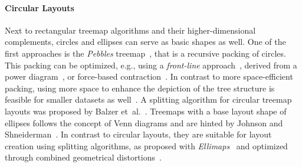 \documentclass[sigconf%
,natbib=true%
]{acmart}
\begin{document}
\paragraph{\textbf{Circular Layouts}}
Next to rectangular treemap algorithms and their higher-dimensional complements, circles and ellipses can serve as basic shapes as well.
One of the first approaches is the \emph{Pebbles} treemap~\cite{wetzel2003-pebbles}, that is a recursive packing of circles.
This packing can be optimized, e.g., using a \emph{front-line} approach~\cite{wang2006-circlepacking}, derived from a power diagram~\cite{zhao2015-circulartreemap}, or force-based contraction~\cite{gortler2017-bubbletreemaps}.
In contrast to more space-efficient packing, using more space to enhance the depiction of the tree structure is feasible for smaller datasets as well~\cite{parsia2005-cropcircles}.
A splitting algorithm for circular treemap layouts was proposed by Balzer et~al.~\cite{balzer2004-softwarelandscapes}.
Treemaps with a base layout shape of ellipses follows the concept of Venn diagrams and are hinted by Johnson and Shneiderman~\cite{johnson1991-spacefilling}.
In contrast to circular layouts, they are suitable for layout creation using splitting algorithms, as proposed with \emph{Ellimaps}~\cite{otjacques2007-ellimaps} and optimized through combined geometrical distortions~\cite{otjacques2009-cgdellimaps}.
\end{document}
